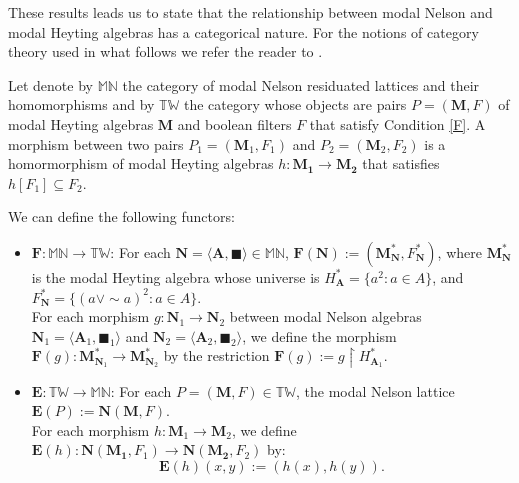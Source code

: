 \documentclass[pdflatex,sn-mathphys-num]{sn-jnl}%
\newcommand{\A}{\mathbf{A}}
\newcommand{\MN}{\mathbb{MN}}
\theoremstyle{thmstyleone}%
\theoremstyle{thmstyletwo}%
\theoremstyle{thmstylethree}%
\begin{document}
These results leads us to state that the relationship between modal Nelson and modal Heyting algebras has a categorical nature. For the notions of category theory used in what follows we refer the reader to \cite{MacL98}.

Let denote by $\MN$ the category of modal Nelson residuated lattices and their homomorphisms and by $\mathbb{TW}$ the category whose objects are pairs $P=(\mathbf{M},F)$ of modal Heyting algebras $\mathbf{M}$ and boolean filters $F$ that satisfy Condition \eqref{F}. A morphism between two pairs $P_1=(\mathbf{M}_1,F_1)$ and $P_2=(\mathbf{M}_2,F_2)$ is a homormorphism of modal Heyting algebras $h\colon \mathbf{M_1}\to \mathbf{M_2}$ that satisfies $h[F_1]\subseteq F_2$. 

We can define the following functors:
\begin{itemize}
    \item $\mathbf{F}\colon \MN \to \mathbb{TW}$: For each $\mathbf{N}=\langle\A,\blacksquare\rangle \in \MN$, $\mathbf{F}(\mathbf{N}):=(\mathbf{M}_\mathbf{N}^*,F_\mathbf{N}^*)$, where $\mathbf{M}_\mathbf{N}^*$ is the modal Heyting algebra whose universe is $H_\A^* = \{  a^2 : a\in A \}$, and $F_\mathbf{N}^* = \{(a\vee \sim a)^2 : a \in A\}$.  \\
    For each morphism $g: \mathbf{N}_1 \to \mathbf{N}_2$ between modal Nelson algebras $\mathbf{N}_1=\langle\A_1,\blacksquare_1\rangle$ and $\mathbf{N}_2=\langle\A_2,\blacksquare_2\rangle$, we define the morphism $\mathbf{F}(g)\colon \mathbf{M}_{\mathbf{N}_1}^*\to \mathbf{M}_{\mathbf{N}_2}^* $ by the restriction $\mathbf{F}(g) := g\upharpoonright H_{\A_1}^*$. 
    \item $\mathbf{E}: \mathbb{TW} \to \MN$: For each $P=(\mathbf{M},F) \in \mathbb{TW}$, the modal Nelson lattice $\mathbf{E}(P):=\mathbf{N}(\mathbf{M},F)$. \\ 
    For each morphism $h:\mathbf{M}_1 \to \mathbf{M}_2$, we define $\mathbf{E}(h)\colon \mathbf{N}(\mathbf{M_1},F_1)\to \mathbf{N}(\mathbf{M_2},F_2)$ by:  
    \[
    \mathbf{E}(h)(x,y) := (h(x), h(y)).
    \] 
\end{itemize}
\end{document}

